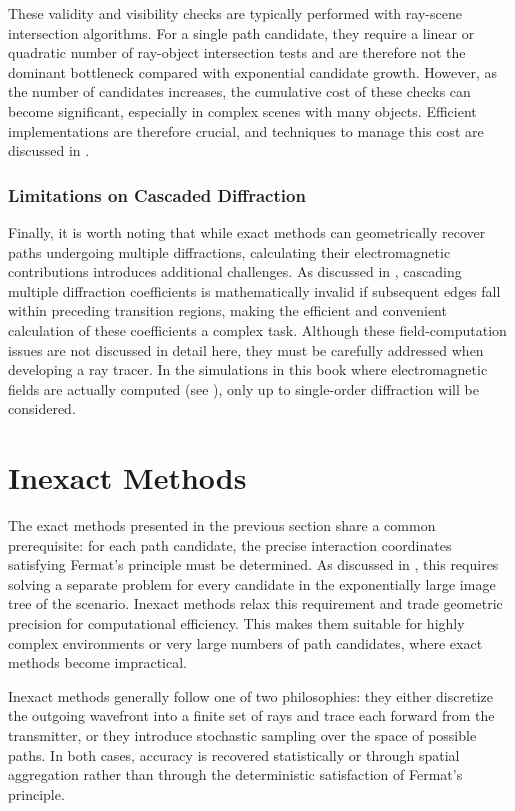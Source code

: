 These validity and visibility checks are typically performed with ray-scene intersection algorithms. For a single path candidate, they require a linear or quadratic number of ray-object intersection tests and are therefore not the dominant bottleneck compared with exponential candidate growth. However, as the number of candidates increases, the cumulative cost of these checks can become significant, especially in complex scenes with many objects. Efficient implementations are therefore crucial, and techniques to manage this cost are discussed in .

\subsubsection{Limitations on Cascaded Diffraction}

Finally, it is worth noting that while exact methods can geometrically recover paths undergoing multiple diffractions, calculating their electromagnetic contributions introduces additional challenges. As discussed in , cascading multiple diffraction coefficients is mathematically invalid if subsequent edges fall within preceding transition regions, making the efficient and convenient calculation of these coefficients a complex task. Although these field-computation issues are not discussed in detail here, they must be carefully addressed when developing a ray tracer. In the simulations in this book where electromagnetic fields are actually computed (see ), only up to single-order diffraction will be considered.

\section{Inexact Methods}

The exact methods presented in the previous section share a common prerequisite: for each path candidate, the precise interaction coordinates satisfying Fermat's principle must be determined. As discussed in , this requires solving a separate problem for every candidate in the exponentially large image tree of the scenario. Inexact methods relax this requirement and trade geometric precision for computational efficiency. This makes them suitable for highly complex environments or very large numbers of path candidates, where exact methods become impractical.

Inexact methods generally follow one of two philosophies: they either discretize the outgoing wavefront into a finite set of rays and trace each forward from the transmitter, or they introduce stochastic sampling over the space of possible paths. In both cases, accuracy is recovered statistically or through spatial aggregation rather than through the deterministic satisfaction of Fermat's principle.


